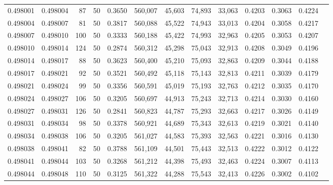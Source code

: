 \begin{tabular}{rrrrrrrrrrrrr}
0.498001 & 0.498004 &    87 &  50 &                                     0.3650 & 560,007 &  45,603 &  74,893 &  33,063 & 0.4203 & 0.3063 & 0.4224 \\
0.498004 & 0.498007 &    81 &  50 &                                     0.3817 & 560,088 &  45,522 &  74,943 &  33,013 & 0.4204 & 0.3058 & 0.4217 \\
0.498007 & 0.498010 &   100 &  50 &                                     0.3333 & 560,188 &  45,422 &  74,993 &  32,963 & 0.4205 & 0.3053 & 0.4207 \\
0.498010 & 0.498014 &   124 &  50 &                                     0.2874 & 560,312 &  45,298 &  75,043 &  32,913 & 0.4208 & 0.3049 & 0.4196 \\
0.498014 & 0.498017 &    88 &  50 &                                     0.3623 & 560,400 &  45,210 &  75,093 &  32,863 & 0.4209 & 0.3044 & 0.4188 \\
0.498017 & 0.498021 &    92 &  50 &                                     0.3521 & 560,492 &  45,118 &  75,143 &  32,813 & 0.4211 & 0.3039 & 0.4179 \\
0.498021 & 0.498024 &    99 &  50 &                                     0.3356 & 560,591 &  45,019 &  75,193 &  32,763 & 0.4212 & 0.3035 & 0.4170 \\
0.498024 & 0.498027 &   106 &  50 &                                     0.3205 & 560,697 &  44,913 &  75,243 &  32,713 & 0.4214 & 0.3030 & 0.4160 \\
0.498027 & 0.498031 &   126 &  50 &                                     0.2841 & 560,823 &  44,787 &  75,293 &  32,663 & 0.4217 & 0.3026 & 0.4149 \\
0.498031 & 0.498034 &    98 &  50 &                                     0.3378 & 560,921 &  44,689 &  75,343 &  32,613 & 0.4219 & 0.3021 & 0.4140 \\
0.498034 & 0.498038 &   106 &  50 &                                     0.3205 & 561,027 &  44,583 &  75,393 &  32,563 & 0.4221 & 0.3016 & 0.4130 \\
0.498038 & 0.498041 &    82 &  50 &                                     0.3788 & 561,109 &  44,501 &  75,443 &  32,513 & 0.4222 & 0.3012 & 0.4122 \\
0.498041 & 0.498044 &   103 &  50 &                                     0.3268 & 561,212 &  44,398 &  75,493 &  32,463 & 0.4224 & 0.3007 & 0.4113 \\
0.498044 & 0.498048 &   110 &  50 &                                     0.3125 & 561,322 &  44,288 &  75,543 &  32,413 & 0.4226 & 0.3002 & 0.4102 \\

\end{tabular}
